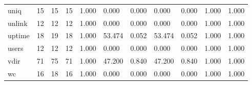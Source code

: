 \begin{longtable}{lp{1.2cm}p{1.2cm}p{1.2cm}p{1.2cm}p{1.2cm}p{1.2cm}p{1.2cm}p{1.2cm}p{1.2cm}p{1.2cm}}
uniq      &                           15 &                 15 &                                15 &                                      1.000 &                                  0.000 &                                        0.000 &                             0.000 &                                   0.000 &                              1.000 &                                              1.000 \\
unlink    &                           12 &                 12 &                                12 &                                      1.000 &                                  0.000 &                                        0.000 &                             0.000 &                                   0.000 &                              1.000 &                                              1.000 \\
uptime    &                           18 &                 19 &                                18 &                                      1.000 &                                 53.474 &                                        0.052 &                            53.474 &                                   0.052 &                              1.000 &                                              1.000 \\
users     &                           12 &                 12 &                                12 &                                      1.000 &                                  0.000 &                                        0.000 &                             0.000 &                                   0.000 &                              1.000 &                                              1.000 \\
vdir      &                           71 &                 75 &                                71 &                                      1.000 &                                 47.200 &                                        0.840 &                            47.200 &                                   0.840 &                              1.000 &                                              1.000 \\
wc        &                           16 &                 18 &                                16 &                                      1.000 &                                  0.000 &                                        0.000 &                             0.000 &                                   0.000 &                              1.000 &                                              1.000 \\

\end{longtable}
